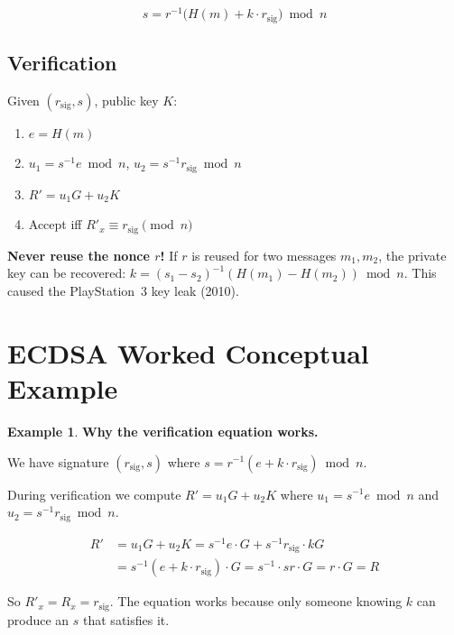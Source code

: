 \documentclass[12pt,a4paper,openany]{book}
\theoremstyle{definition}
\newtheorem{example}{Example}[chapter]
\theoremstyle{plain}
\theoremstyle{remark}
\begin{document}
\begin{equation}
  \boxed{s = r^{-1}\!\bigl(H(m)+k\cdot r_{\text{sig}}\bigr)\bmod n}
\end{equation}

\subsection{Verification}

Given $(r_{\text{sig}},s)$, public key $K$:
\begin{enumerate}
  \item $e = H(m)$
  \item $u_1 = s^{-1}e\bmod n$, \quad $u_2 = s^{-1}r_{\text{sig}}\bmod n$
  \item $R' = u_1 G + u_2 K$
  \item Accept iff $R'_x\equiv r_{\text{sig}}\pmod n$
\end{enumerate}

\begin{exambox}
  \textbf{Never reuse the nonce $r$!}  If $r$ is reused for two messages
  $m_1,m_2$, the private key can be recovered:
  $k = (s_1-s_2)^{-1}(H(m_1)-H(m_2))\bmod n$.
  This caused the PlayStation~3 key leak (2010).
\end{exambox}

\section{ECDSA Worked Conceptual Example}

\begin{example}
  \textbf{Why the verification equation works.}

  We have signature $(r_{\text{sig}}, s)$ where
  $s = r^{-1}(e + k\cdot r_{\text{sig}})\bmod n$.

  During verification we compute $R' = u_1 G + u_2 K$ where
  $u_1 = s^{-1}e\bmod n$ and $u_2 = s^{-1}r_{\text{sig}}\bmod n$.

  \begin{align*}
    R' &= u_1 G + u_2 K = s^{-1}e\cdot G + s^{-1}r_{\text{sig}}\cdot kG \\
       &= s^{-1}(e + k\cdot r_{\text{sig}})\cdot G = s^{-1}\cdot s r\cdot G = r\cdot G = R
  \end{align*}

  So $R'_x = R_x = r_{\text{sig}}$.  The equation works because only
  someone knowing $k$ can produce an $s$ that satisfies it.
\end{example}
\end{document}
